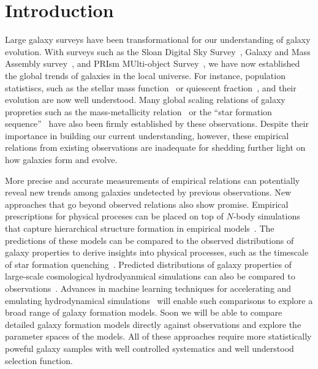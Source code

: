 \section{Introduction} \label{sec:intro} 
Large galaxy surveys have been transformational for our understanding of galaxy
evolution. 
With surveys such as the Sloan Digital Sky Survey~\citep[SDSS;][]{york2000},
Galaxy and Mass Assembly survey~\citep[GAMA;][]{driver2011}, and 
PRIsm MUlti-object Survey~\citep[PRIMUS;][]{coil2011}, 
we have now established the global trends of galaxies in the local universe. 
For instance, population statistiscs, such as the stellar mass
function~\citep{li2009, marchesini2009, moustakas2013} or quiescent
fraction~\citep{kauffmann2003a, blanton2003, baldry2006, taylor2009}, and their
evolution are now well understood. 
Many global scaling relations of galaxy propreties such as the mass-metallicity
relation~\citep{tremonti2004} or
the ``star formation sequence''~\citep{noeske2007, daddi2007, salim2007} have
also been firmly established by these observations. 
Despite their importance in building our current understanding, however,
these empirical relations from existing observations are inadequate for
shedding further light on how galaxies form and evolve.

More precise and accurate measurements of empirical relations can potentially
reveal new trends among galaxies undetected by previous observations.
New approaches that go beyond observed relations also show promise.
Empirical prescriptions for physical proceses can be placed on top of $N$-body
simulations that capture hierarchical structure formation in empirical 
models~\citep[\emph{e.g.} {\sc UniverseMachine}][]{behroozi2019}. 
The predictions of these models can be compared to the observed distributions
of galaxy properties to derive insights into physical processes, such as the
timescale of star formation quenching~\citep{wetzel2013, hahn2017, tinker2017}. 
Predicted distributions of galaxy properties of large-scale cosmological 
hydrodyanmical simulations can also be compared to 
observations~\citep[\emph{e.g.}][]{genel2014, somerville2015a, dave2017a,
trayford2017, dickey2021, donnari2021}.
Advances in machine learning techniques for accelerating and emulating
hydrodynamical simulations~\citep{villaescusa-navarro2021} will enable such
comparisons to explore a broad range of galaxy formation models.
Soon we will be able to compare detailed galaxy formation models directly
against observations and explore the parameter spaces of the models. 
All of these approaches require more statistically poweful galaxy samples with
well controlled systematics and well understood selection function. 

